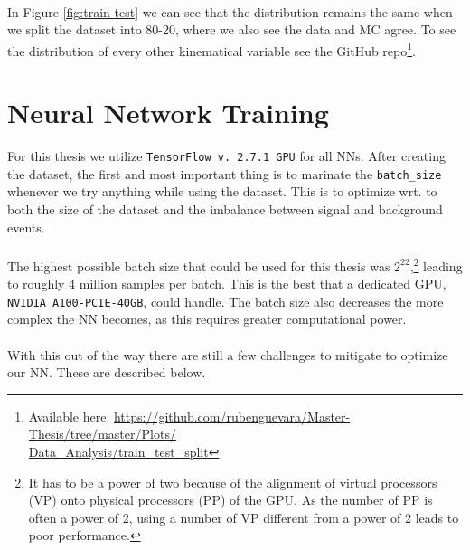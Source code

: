 \documentclass[12pt, a4paper]{book}
\begin{document}
\\In Figure \ref{fig:train-test} we can see that the distribution remains the same when we split the dataset into 80-20, where we also see the data and MC agree. To see the distribution of every other kinematical variable see the GitHub repo\footnote{Available here: \href{https://github.com/rubenguevara/Master-Thesis/tree/master/Plots/Data_Analysis/train_test_split}{https://github.com/rubenguevara/Master-Thesis/tree/master/Plots/\\Data\_Analysis/train\_test\_split}}.


\clearpage
\section{Neural Network Training}\label{chap:NN_train}
For this thesis we utilize \verb|TensorFlow v. 2.7.1 GPU| for all NNs. After creating the dataset, the first and most important thing is to marinate the \verb|batch_size| whenever we try anything while using the dataset. This is to optimize wrt. to both the size 
of the dataset and the imbalance between signal and background events.\\
\\The highest possible batch size that could be used for this thesis was $2^{22}$,\footnote{It has to be a power of two because of the alignment of virtual processors (VP) onto physical processors (PP) of the GPU. As the number of PP is often a power of 2, using a number of VP different from a power of 2 leads to poor performance.} 
leading to roughly 4 million samples per batch. This is the best that a dedicated GPU, \verb|NVIDIA A100-PCIE-40GB|, could handle. The batch size also decreases the more complex the NN becomes, as this requires greater computational power.\\
\\With this out of the way there are still a few challenges to mitigate to optimize our NN. These are described below.
\end{document}
